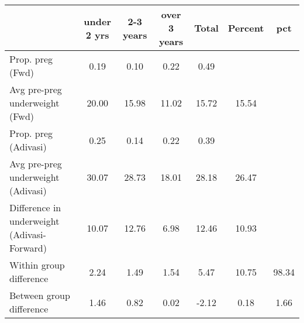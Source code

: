 \begin{tabular}{l*{6}{c}}
\toprule
            &\multicolumn{1}{c}{under 2 yrs}&\multicolumn{1}{c}{2-3 years}&\multicolumn{1}{c}{over 3 years}&\multicolumn{1}{c}{Total}&\multicolumn{1}{c}{Percent}&\multicolumn{1}{c}{pct}\\
\midrule
\midrule
Prop. preg (Fwd)&        0.19&        0.10&        0.22&        0.49&            &            \\
Avg pre-preg underweight (Fwd)&       20.00&       15.98&       11.02&       15.72&       15.54&            \\
Prop. preg (Adivasi)&        0.25&        0.14&        0.22&        0.39&            &            \\
Avg pre-preg underweight (Adivasi)&       30.07&       28.73&       18.01&       28.18&       26.47&            \\
Difference in underweight (Adivasi-Forward)&       10.07&       12.76&        6.98&       12.46&       10.93&            \\
Within group difference&        2.24&        1.49&        1.54&        5.47&       10.75&       98.34\\
Between group difference&        1.46&        0.82&        0.02&       -2.12&        0.18&        1.66\\
\bottomrule
\end{tabular}
